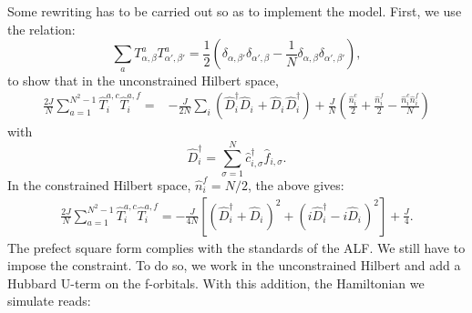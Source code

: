Some  rewriting has to be carried out so as to implement  the model.   First, we  use the  relation:
\begin{equation*}
	\sum_{a} T^{a}_{\alpha,\beta} T^{a}_{\alpha',\beta'} = \frac{1}{2} \left(  \delta_{\alpha,\beta'}  \delta_{\alpha',\beta} - \frac{1}{N} \delta_{\alpha,\beta} \delta_{\alpha', \beta'} \right), 
\end{equation*}
to  show that  in the unconstrained Hilbert space,
\begin{align}
	 \frac{2 J}{N} \sum_{ a=1  }^{N^2 -1}  \hat{T}^{a,c}_{i}  \hat{T}^{a,f}_{i}   = &   - \frac{J}{2N} \sum_{i}  \left( 
                \hat{D}^{\dagger}_{i} \hat{D}^{\phantom\dagger}_{i}   +    \hat{D}^{\phantom\dagger}_{i} \hat{D}^{\dagger}_{i}    \right)    + \frac{J}{N}   \left(   \frac{\hat{n}^{c}_i}{2}  + \frac{\hat{n}^{f}_i}{2} -  \frac{\hat{n}^{c}_i \hat{n}^{f}_i}{N}   \right) \nonumber 
 \end{align}
with
\begin{equation*}
	   \hat{D}^{\dagger}_{i}   =  \sum_{\sigma=1}^{N} \hat{c}^{\dagger}_{i,\sigma}  \hat{f}^{\phantom\dagger}_{i,\sigma}.
\end{equation*}
In the constrained Hilbert space, $\hat{n}^{f}_i = N/2 $, the above gives:
\begin{align}
	 \frac{2 J}{N} \sum_{ a=1  }^{N^2 -1}  \hat{T}^{a,c}_{i}  \hat{T}^{a,f}_{i}   =     -  \frac{J}{4N}    \left[ \left(   \hat{D}^{\dagger}_{i}  + \hat{D}^{\phantom\dagger}_{i}    \right)^{2}  + 
                                                       \left(  i\hat{D}^{\dagger}_{i}  - i  \hat{D}^{\phantom\dagger}_{i}    \right)^2  \right] + \frac{J}{4}.  
 \end{align}
The  prefect square form  complies with the standards of the ALF.      We still have to impose the constraint. To do so, we   work in the unconstrained Hilbert  and add a Hubbard  U-term on  the f-orbitals.    With this addition, the Hamiltonian we simulate reads: 

